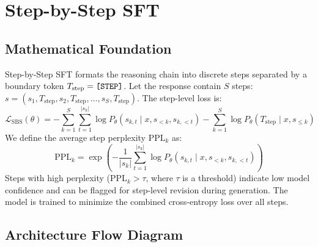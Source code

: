 \newpage
\section{Step-by-Step SFT}

\subsection{Mathematical Foundation}
Step-by-Step SFT formats the reasoning chain into discrete steps separated by a boundary token $T_{\text{step}} = \text{\texttt{[STEP]}}$. Let the response contain $S$ steps: $s = (s_1, T_{\text{step}}, s_2, T_{\text{step}}, \dots, s_S, T_{\text{step}})$. The step-level loss is:
\begin{equation}
  \mathcal{L}_{\text{SBS}}(\theta) = -\sum_{k=1}^S \sum_{t=1}^{|s_k|} \log P_\theta(s_{k,t} \mid x, s_{<k}, s_{k,<t}) - \sum_{k=1}^S \log P_\theta(T_{\text{step}} \mid x, s_{\le k})
\end{equation}
We define the average step perplexity $\text{PPL}_k$ as:
\begin{equation}
  \text{PPL}_k = \exp\left( -\frac{1}{|s_k|} \sum_{t=1}^{|s_k|} \log P_\theta(s_{k,t} \mid x, s_{<k}, s_{k,<t}) \right)
\end{equation}
Steps with high perplexity ($\text{PPL}_k > \tau$, where $\tau$ is a threshold) indicate low model confidence and can be flagged for step-level revision during generation.
The model is trained to minimize the combined cross-entropy loss over all steps.

\subsection{Architecture Flow Diagram}

